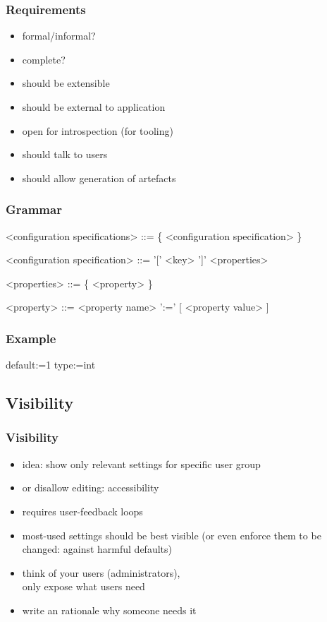 \begin{frame}
	\frametitle{Requirements}

	\begin{itemize}
	\item formal/informal?
	\item complete?
	\pause
	\item should be extensible
	\item should be external to application
	\item open for introspection (for tooling)
	\item should talk to users
	\item should allow generation of artefacts
	\end{itemize}
\end{frame}


\begin{frame}[fragile]
	\frametitle{Grammar}
	\begin{grammar}
	<configuration specifications> ::= \{ <configuration specification> \}

	<configuration specification> ::= '[' <key> ']' <properties>

	<properties> ::= \{ <property> \}

	<property> ::= <property name> ':=' [ <property value> ]
	\end{grammar}
\end{frame}


\begin{frame}[fragile]
	\frametitle{Example}
	\begin{code}
	default:=1
	type:=int
	\end{code}
\end{frame}

\subsection{Visibility}

\begin{frame}
	\frametitle{Visibility}
	\begin{itemize}
	\item idea: show only relevant settings for specific user group
	\item or disallow editing: accessibility
	\pause
	\item requires user-feedback loops~\cite{xu2015hey}
	\item most-used settings should be best visible (or even enforce them to be changed: against harmful defaults)
	\item think of your users (administrators), \\ only expose what users need
	\item write an rationale why someone needs it
	\end{itemize}
\end{frame}

